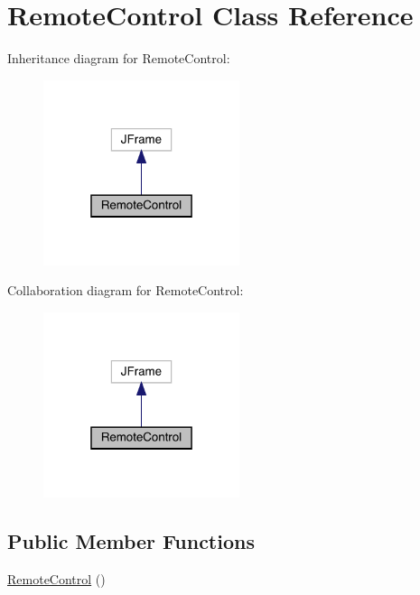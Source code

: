 \hypertarget{class_remote_control}{}\section{Remote\+Control Class Reference}
\label{class_remote_control}


Inheritance diagram for Remote\+Control\+:
\nopagebreak
\begin{figure}[H]
\begin{center}
\leavevmode
\includegraphics[width=163pt]{class_remote_control__inherit__graph}
\end{center}
\end{figure}


Collaboration diagram for Remote\+Control\+:
\nopagebreak
\begin{figure}[H]
\begin{center}
\leavevmode
\includegraphics[width=163pt]{class_remote_control__coll__graph}
\end{center}
\end{figure}
\subsection*{Public Member Functions}
\begin{DoxyCompactItemize}
\item 
\mbox{\hyperlink{class_remote_control_a32595c785f3eac1903ddc620fc2d7671}{Remote\+Control}} ()
\end{DoxyCompactItemize}

